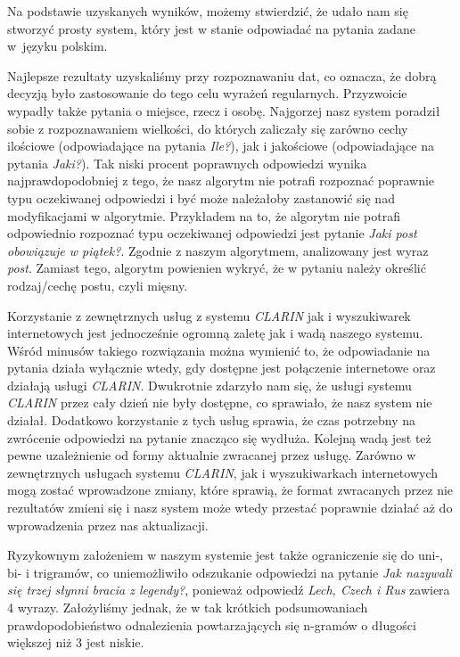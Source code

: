 Na podstawie uzyskanych wyników, możemy stwierdzić, że udało nam się stworzyć prosty system, który jest w stanie odpowiadać na pytania zadane w~języku polskim.

Najlepsze rezultaty uzyskaliśmy przy rozpoznawaniu dat, co oznacza, że dobrą decyzją było zastosowanie do tego celu wyrażeń regularnych. Przyzwoicie wypadły także pytania o miejsce, rzecz i osobę. Najgorzej nasz system poradził sobie z rozpoznawaniem wielkości, do których zaliczały się zarówno cechy ilościowe (odpowiadające na pytania \emph{Ile?}), jak i jakościowe (odpowiadające na pytania \emph{Jaki?}). Tak niski procent poprawnych odpowiedzi wynika najprawdopodobniej z tego, że nasz algorytm nie potrafi rozpoznać poprawnie typu oczekiwanej odpowiedzi i być może należałoby zastanowić się nad modyfikacjami w algorytmie. Przykładem na to, że algorytm nie potrafi odpowiednio rozpoznać typu oczekiwanej odpowiedzi jest pytanie \emph{Jaki post obowiązuje w piątek?}. Zgodnie z naszym algorytmem, analizowany jest wyraz \emph{post}. Zamiast tego, algorytm powienien wykryć, że w pytaniu należy określić rodzaj/cechę postu, czyli mięsny.

Korzystanie z zewnętrznych usług z systemu \emph{CLARIN} jak i wyszukiwarek internetowych jest jednocześnie ogromną zaletę jak i wadą naszego systemu. Wśród minusów takiego rozwiązania można wymienić to, że odpowiadanie na pytania działa wyłącznie wtedy, gdy dostępne jest połączenie internetowe oraz działają usługi \emph{CLARIN}. Dwukrotnie zdarzyło nam się, że usługi systemu \emph{CLARIN} przez cały dzień nie były dostępne, co sprawiało, że nasz system nie działał. Dodatkowo korzystanie z tych usług sprawia, że czas potrzebny na zwrócenie odpowiedzi na pytanie znacząco się wydłuża. Kolejną wadą jest też pewne uzależnienie od formy aktualnie zwracanej przez usługę. Zarówno w zewnętrznych usługach systemu \emph{CLARIN}, jak i wyszukiwarkach internetowych mogą zostać wprowadzone zmiany, które sprawią, że format zwracanych przez nie rezultatów zmieni się i nasz system może wtedy przestać poprawnie działać aż do wprowadzenia przez nas aktualizacji. 

Ryzykownym założeniem w naszym systemie jest także ograniczenie się do uni-, bi- i trigramów, co uniemożliwiło odszukanie odpowiedzi na pytanie \emph{Jak nazywali się trzej słynni bracia z legendy?}, ponieważ odpowiedź \emph{Lech, Czech i Rus} zawiera 4 wyrazy. Założyliśmy jednak, że w tak krótkich podsumowaniach prawdopodobieństwo odnalezienia powtarzających się n-gramów o długości większej niż 3 jest niskie.

